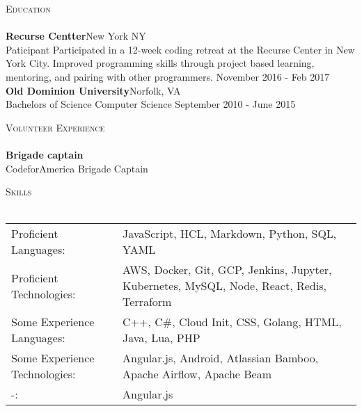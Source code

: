 \documentclass[a4paper]{article}
\newcommand{\lineunder} {
    \vspace*{-8pt} \\
    \hspace*{-18pt} \hrulefill \\
}
\newcommand{\header} [1] {
    {\hspace*{-18pt}\vspace*{6pt} \textsc{#1}}
    \vspace*{-6pt} \lineunder
}
\begin{document}
\header{Education}
\textbf{Recurse Centter}\hfill New York NY\\
Paticipant Participated in a 12-week coding retreat at the Recurse Center in New York City. Improved programming skills through project based learning, mentoring, and pairing with other programmers. \hfill November 2016 - Feb 2017\\
\vspace{2mm}
\textbf{Old Dominion University}\hfill Norfolk, VA\\
Bachelors of Science Computer Science \hfill September 2010 - June 2015\\
\vspace{2mm}

\header{Volunteer Experience}
{\textbf{Brigade captain}}\\
CodeforAmerica Brigade Captain\\
\vspace*{2mm}

\header{Skills}
\begin{tabular}{ l l }
	Proficient Languages:         & JavaScript, HCL, Markdown, Python, SQL, YAML                                              \\
	Proficient Technologies:      & AWS, Docker, Git, GCP, Jenkins, Jupyter, Kubernetes, MySQL, Node, React, Redis, Terraform \\
	Some Experience Languages:    & C++, C\#, Cloud Init, CSS, Golang, HTML, Java, Lua, PHP                                   \\
	Some Experience Technologies: & Angular.js, Android, Atlassian Bamboo, Apache Airflow, Apache Beam                        \\
	-:                            & Angular.js                                                                                \\
\end{tabular}
\vspace{2mm}



\ 
\end{document}
